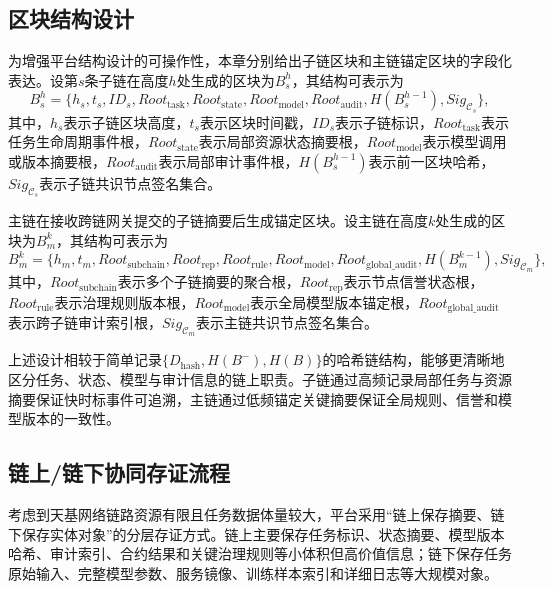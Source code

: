 \subsection{区块结构设计}

为增强平台结构设计的可操作性，本章分别给出子链区块和主链锚定区块的字段化表达。设第\(s\)条子链在高度\(h\)处生成的区块为\(B_s^h\)，其结构可表示为
\begin{equation}
  B_s^h=\{h_s,t_s,ID_s,Root_{\mathrm{task}},Root_{\mathrm{state}},Root_{\mathrm{model}},Root_{\mathrm{audit}},H(B_s^{h-1}),Sig_{\mathcal{C}_s}\},
  \label{eq:sub_block}
\end{equation}
其中，\(h_s\)表示子链区块高度，\(t_s\)表示区块时间戳，\(ID_s\)表示子链标识，\(Root_{\mathrm{task}}\)表示任务生命周期事件根，\(Root_{\mathrm{state}}\)表示局部资源状态摘要根，\(Root_{\mathrm{model}}\)表示模型调用或版本摘要根，\(Root_{\mathrm{audit}}\)表示局部审计事件根，\(H(B_s^{h-1})\)表示前一区块哈希，\(Sig_{\mathcal{C}_s}\)表示子链共识节点签名集合。

主链在接收跨链网关提交的子链摘要后生成锚定区块。设主链在高度\(k\)处生成的区块为\(B_m^k\)，其结构可表示为
\begin{equation}
  B_m^k=\{h_m,t_m,Root_{\mathrm{subchain}},Root_{\mathrm{rep}},Root_{\mathrm{rule}},Root_{\mathrm{model}},Root_{\mathrm{global\_audit}},H(B_m^{k-1}),Sig_{\mathcal{C}_m}\},
  \label{eq:main_block}
\end{equation}
其中，\(Root_{\mathrm{subchain}}\)表示多个子链摘要的聚合根，\(Root_{\mathrm{rep}}\)表示节点信誉状态根，\(Root_{\mathrm{rule}}\)表示治理规则版本根，\(Root_{\mathrm{model}}\)表示全局模型版本锚定根，\(Root_{\mathrm{global\_audit}}\)表示跨子链审计索引根，\(Sig_{\mathcal{C}_m}\)表示主链共识节点签名集合。

上述设计相较于简单记录\(\{D_{\mathrm{hash}},H(B^-),H(B)\}\)的哈希链结构，能够更清晰地区分任务、状态、模型与审计信息的链上职责。子链通过高频记录局部任务与资源摘要保证快时标事件可追溯，主链通过低频锚定关键摘要保证全局规则、信誉和模型版本的一致性。

\subsection{链上/链下协同存证流程}

考虑到天基网络链路资源有限且任务数据体量较大，平台采用“链上保存摘要、链下保存实体对象”的分层存证方式。链上主要保存任务标识、状态摘要、模型版本哈希、审计索引、合约结果和关键治理规则等小体积但高价值信息；链下保存任务原始输入、完整模型参数、服务镜像、训练样本索引和详细日志等大规模对象。

